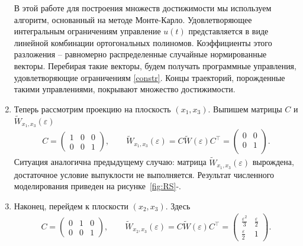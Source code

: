 \documentclass[../main.tex]{subfiles}
\begin{document}
\begin{enumerate}
        В этой работе для построения множеств достижимости мы используем алгоритм, основанный на методе Монте-Карло. %
        Удовлетворяющее интегральным ограничениям управление $ u(t) $ представляется в виде линейной комбинации ортогональных полиномов. Коэффициенты этого разложения -- равномерно распределенные случайные нормированные векторы. Перебирая такие векторы, будем получать программные управления, удовлетворяющие ограничениям \eqref{constr}. Концы траекторий, порожденные такими управлениями, покрывают множество достижимости.
        
        
        \item Теперь рассмотрим проекцию на плоскость $ (x_1, x_3) $. Выпишем матрицы $ C $ и $ \widetilde{W}_{x_1,x_3}(\varepsilon) $
        \begin{gather*}
            C = \begin{pmatrix}
                1 & 0 & 0 \\
                0 & 0 & 1
            \end{pmatrix}, \qquad
            \widetilde{W}_{x_1,x_3}(\varepsilon) =  C \widetilde{W} (\varepsilon) C^{\top}  =\begin{pmatrix}
                0 & 0 \\
                0 & 1 \\
            \end{pmatrix} .
        \end{gather*}
        Ситуация аналогична предыдущему случаю: матрица $ \widetilde{W}_{x_1,x_3}(\varepsilon)  $ вырождена, достаточное условие выпуклости не выполняется. Результат численного моделирования приведен на рисунке~\ref{fig:RS}-.
        \item Наконец, перейдем к плоскости $ (x_2, x_3) $. Здесь
        \begin{gather*}
            C = \begin{pmatrix}
                0 & 1 & 0 \\
                0 & 0 & 1
            \end{pmatrix}, \qquad \widetilde{W}_{x_2,x_3}(\varepsilon) =  C \widetilde{W} (\varepsilon) C^{\top}  =\begin{pmatrix}
                \frac{\varepsilon^2}{3} & \frac{\varepsilon}{2} \\
                \frac{\varepsilon}{2} & 1
            \end{pmatrix}.
        \end{gather*}

\end{enumerate}
\end{document}
